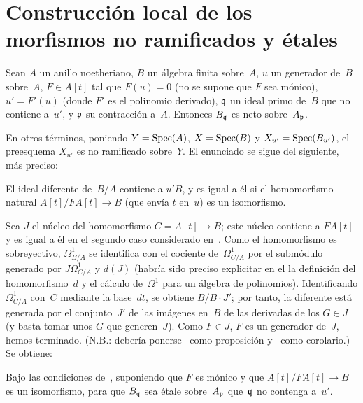 \section{Construcción local de los morfismos no ramificados y étales}
\label{I.7}

\begin{proposition}
\label{I.7.1}
Sean $A$ un anillo noetheriano, $B$ un álgebra finita sobre~$A$, $u$ un generador de~$B$ sobre~$A$, $F\in A[t]$ tal que $F(u)=0$ (no se supone que $F$ sea mónico), $u'=F'(u)$ (donde $F'$ es el polinomio derivado), $\mathfrak{q}$ un ideal primo de~$B$ que no contiene a~$u'$, y $\mathfrak{p}$ su contracción a~$A$. Entonces $B_{\mathfrak{q}}$ es neto sobre~$A_{\mathfrak{p}}$.
\end{proposition}

En otros términos, poniendo $Y=\operatorname{Spec}(A)$, $X=\operatorname{Spec}(B)$ y $X_{u'}=\operatorname{Spec}(B_{u'})$, el preesquema $X_{u'}$ es no ramificado sobre~$Y$. El enunciado se sigue del siguiente, más preciso:

\begin{corollaire}
\label{I.7.2}
El ideal diferente de~$B/A$ contiene a $u'B$, y es igual a él si el homomorfismo natural $A[t]/FA[t]\to B$ (que envía $t$ en~$u$) es un isomorfismo.
\end{corollaire}

Sea $J$ el núcleo del homomorfismo $C=A[t]\to B$; este núcleo contiene a $FA[t]$ y es igual a él en el segundo caso considerado en~. Como el homomorfismo es sobreyectivo, $\Omega^1_{B/A}$ se identifica con el cociente de~$\Omega^1_{C/A}$ por el submódulo generado por $J\Omega^1_{C/A}$ y $d(J)$ (habría sido preciso explicitar en el \No{} la definición del homomorfismo~$d$ y el cálculo de~$\Omega^1$ para un álgebra de polinomios). Identificando $\Omega^1_{C/A}$ con~$C$ mediante la base~$dt$, se obtiene $B/B\cdot J'$; por tanto, la diferente está generada por el conjunto~$J'$ de las imágenes en~$B$ de las derivadas de los $G\in J$ (y basta tomar unos $G$ que generen~$J$). Como $F\in J$, \resp $F$ es un generador de~$J$, hemos terminado. (N.B.: debería ponerse~ como proposición y~ como corolario.) Se obtiene:

\begin{corollaire}
\label{I.7.3}
Bajo las condiciones de~, suponiendo que $F$ es mónico y que $A[t]/FA[t]\to B$ es un isomorfismo, para que $B_{\mathfrak{q}}$ sea étale sobre~$A_{\mathfrak{p}}$  que~$\mathfrak{q}$ no contenga a~$u'$.
\end{corollaire}

